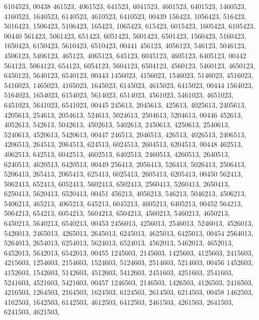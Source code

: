 \begin{DoxyCode}
      6104523,
00438        461523, 4061523,  641523, 6041523, 4601523, 6401523, 1460523, 4160523, 1640523, 6140523, 4610523, 
      6410523,
00439        156423, 1056423,  516423, 5016423, 1506423, 5106423,  165423, 1065423,  615423, 6015423, 1605423, 
      6105423,
00440        561423, 5061423,  651423, 6051423, 5601423, 6501423, 1560423, 5160423, 1650423, 6150423, 5610423, 
      6510423,
00441        456123, 4056123,  546123, 5046123, 4506123, 5406123,  465123, 4065123,  645123, 6045123, 4605123, 
      6405123,
00442        564123, 5064123,  654123, 6054123, 5604123, 6504123, 4560123, 5460123, 4650123, 6450123, 5640123, 
      6540123,
00443       1456023, 4156023, 1546023, 5146023, 4516023, 5416023, 1465023, 4165023, 1645023, 6145023, 4615023, 
      6415023,
00444       1564023, 5164023, 1654023, 6154023, 5614023, 6514023, 4561023, 5461023, 4651023, 6451023, 5641023, 
      6541023,
00445        245613, 2045613,  425613, 4025613, 2405613, 4205613,  254613, 2054613,  524613, 5024613, 2504613, 
      5204613,
00446        452613, 4052613,  542613, 5042613, 4502613, 5402613, 2450613, 4250613, 2540613, 5240613, 4520613, 
      5420613,
00447        246513, 2046513,  426513, 4026513, 2406513, 4206513,  264513, 2064513,  624513, 6024513, 2604513, 
      6204513,
00448        462513, 4062513,  642513, 6042513, 4602513, 6402513, 2460513, 4260513, 2640513, 6240513, 4620513, 
      6420513,
00449        256413, 2056413,  526413, 5026413, 2506413, 5206413,  265413, 2065413,  625413, 6025413, 2605413, 
      6205413,
00450        562413, 5062413,  652413, 6052413, 5602413, 6502413, 2560413, 5260413, 2650413, 6250413, 5620413, 
      6520413,
00451        456213, 4056213,  546213, 5046213, 4506213, 5406213,  465213, 4065213,  645213, 6045213, 4605213, 
      6405213,
00452        564213, 5064213,  654213, 6054213, 5604213, 6504213, 4560213, 5460213, 4650213, 6450213, 5640213, 
      6540213,
00453       2456013, 4256013, 2546013, 5246013, 4526013, 5426013, 2465013, 4265013, 2645013, 6245013, 4625013, 
      6425013,
00454       2564013, 5264013, 2654013, 6254013, 5624013, 6524013, 4562013, 5462013, 4652013, 6452013, 5642013, 
      6542013,
00455       1245603, 2145603, 1425603, 4125603, 2415603, 4215603, 1254603, 2154603, 1524603, 5124603, 2514603, 
      5214603,
00456       1452603, 4152603, 1542603, 5142603, 4512603, 5412603, 2451603, 4251603, 2541603, 5241603, 4521603, 
      5421603,
00457       1246503, 2146503, 1426503, 4126503, 2416503, 4216503, 1264503, 2164503, 1624503, 6124503, 2614503, 
      6214503,
00458       1462503, 4162503, 1642503, 6142503, 4612503, 6412503, 2461503, 4261503, 2641503, 6241503, 4621503, 

\end{DoxyCode}
